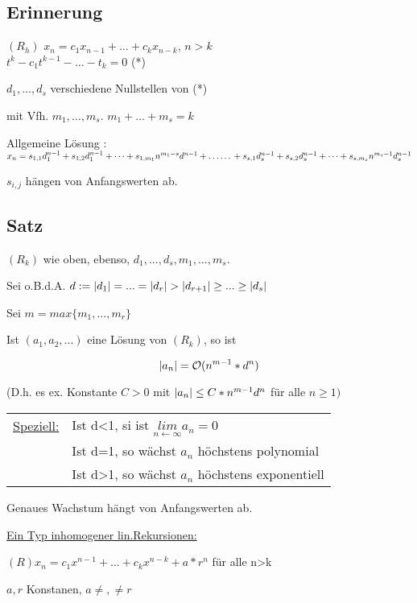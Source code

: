 \subsection*{Erinnerung} %

$(R_h)$ $x_n = c_1x_{n-1} + \dots + c_k x_{n-k}$, $n > k$
\\ $ t^k -c_1t^{k-1} - \dots - t_k = 0 $ (*)

$d_1, \dots, d_s$ verschiedene Nullstellen von (*)

mit Vfh. $m_1, \dots, m_s$. $m_1 + \dots + m_s = k$

Allgemeine Lösung : 
\\$x_n = s_{1, 1}d_1^{n-1} + s_{1, 2}d_1^{n-1} + \dots + s_{1, m_1}n^{m_1-s}d^{n-1}
\\ + \dots \dots
\\ + s_{s,1}d_s^{n-1} + s_{s, 2}d_s^{n-1} + \dots + s_{s, m_s}n^{m_s-1}d_s^{n-1}
$

$s_{i, j}$ hängen von Anfangswerten ab.

\subsection{Satz}
$(R_k)$ wie oben, ebenso, $d_1,...,d_s, m_1,...,m_s.$

Sei o.B.d.A. $d:= \abs{d_1}=...=\abs{d_r}>\abs{d_{r+1}}\geq...\geq \abs{d_s}$

Sei $m = max\{m_1,...,m_r\}$

Ist $(a_1,a_2,...) $ eine Lösung von $(R_k)$, so ist 

$$ \left|a_n\right| = \mathcal{O}(n^{m-1}*d^n)$$

(D.h. es ex. Konstante $C>0$ mit $\left|a_n\right| \leq C*n^{m-1}d^n$ für alle $n \geq 1)$

\begin{tabular}{l l}
\underline{Speziell:}& Ist d<1, si ist $\underset{n\leftarrow \infty}{lim} a_n = 0$\\
& Ist d=1, so wächst $a_n$ höchstens polynomial\\
& Ist d>1, so wächst $a_n$ höchstens exponentiell
\end{tabular}

Genaues Wachstum hängt von Anfangswerten ab.

\underline{Ein Typ inhomogener lin.Rekursionen:}

$(R) x_n = c_1x^{n-1}+...+c_kx^{n-k}+a*r^n$ \qquad für alle n>k

$a,r$ Konstanen, $a\neq , \neq r$

